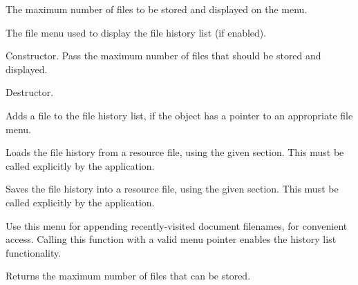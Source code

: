 The maximum number of files to be stored and displayed on the menu.



The file menu used to display the file history list (if enabled).



Constructor. Pass the maximum number of files that should be stored and displayed.



Destructor.



Adds a file to the file history list, if the object has a pointer to an appropriate file menu.



Loads the file history from a resource file, using the given section. This must be called
explicitly by the application.



Saves the file history into a resource file, using the given section. This must be called
explicitly by the application.



Use this menu for appending recently-visited document filenames, for convenient
access. Calling this function with a valid menu pointer enables the history
list functionality.



Returns the maximum number of files that can be stored.

